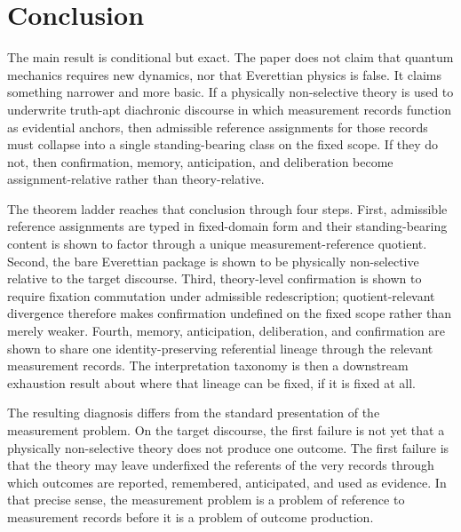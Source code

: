 \section{Conclusion}

The main result is conditional but exact. The paper does not claim that quantum mechanics requires
new dynamics, nor that Everettian physics is false. It claims something narrower and more basic.
If a physically non-selective theory is used to underwrite truth-apt diachronic discourse in which
measurement records function as evidential anchors, then admissible reference assignments for those
records must collapse into a single standing-bearing class on the fixed scope. If they do not, then
confirmation, memory, anticipation, and deliberation become assignment-relative rather than
 theory-relative.

The theorem ladder reaches that conclusion through four steps. First, admissible reference assignments
are typed in fixed-domain form and their standing-bearing content is shown to factor through a unique
measurement-reference quotient. Second, the bare Everettian package is shown to be physically
non-selective relative to the target discourse. Third, theory-level confirmation is shown to require
fixation commutation under admissible redescription; quotient-relevant divergence therefore makes
confirmation undefined on the fixed scope rather than merely weaker. Fourth, memory, anticipation,
deliberation, and confirmation are shown to share one identity-preserving referential lineage through
the relevant measurement records. The interpretation taxonomy is then a downstream exhaustion
result about where that lineage can be fixed, if it is fixed at all.

The resulting diagnosis differs from the standard presentation of the measurement problem. On the
target discourse, the first failure is not yet that a physically non-selective theory does not produce one
outcome. The first failure is that the theory may leave underfixed the referents of the very records
through which outcomes are reported, remembered, anticipated, and used as evidence. In that precise
sense, the measurement problem is a problem of reference to measurement records before it is a
problem of outcome production.
